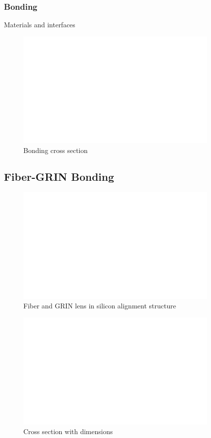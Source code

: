 \subsubsection{Bonding}
Materials and interfaces
\begin{figure}[h!]\centering \includegraphics[width=10cm,draft]{figures/foo.png}
      \caption{Bonding cross section}
\end{figure}

\clearpage
\subsection{Fiber-GRIN Bonding}


\begin{figure}[h!]\centering \includegraphics[width=10cm,draft]{figures/foo.png}
      \caption{Fiber and GRIN lens in silicon alignment structure}
\end{figure}

\begin{figure}[h!]\centering \includegraphics[width=10cm,draft]{figures/foo.png}
      \caption{Cross section with dimensions}
\end{figure}



